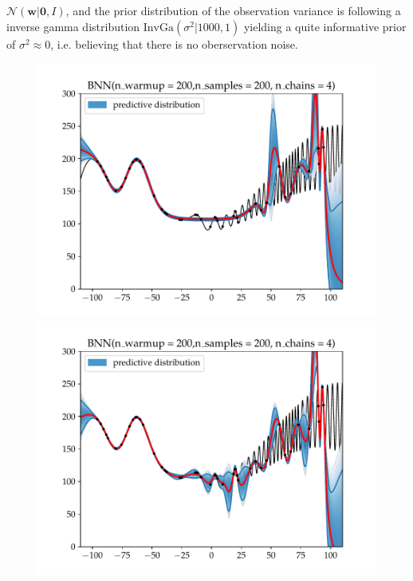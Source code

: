 
$\mathcal{N}(\textbf{w}|\bm{0},I)$, and the prior distribution of the observation
variance is following a inverse gamma distribution $\text{InvGa}(\sigma^2|1000,1)$ yielding a quite 
informative prior of $\sigma^2 \approx 0$, i.e. believing that there is no oberservation noise.

\begin{figure}[h]
    \centering
    \begin{minipage}[b]{0.49\textwidth}
     \includegraphics[trim=1cm 0.7cm 1cm 1cm,clip,width=\textwidth]{Pictures/Test4_BNNhu-10.pdf}
    \end{minipage}
    \hfill
    \begin{minipage}[b]{0.49\textwidth}
      \includegraphics[trim=1cm 0.7cm 1cm 1cm,clip,width=\textwidth]{Pictures/Test4_BNNhu-50.pdf}

\end{minipage}
\end{figure}
